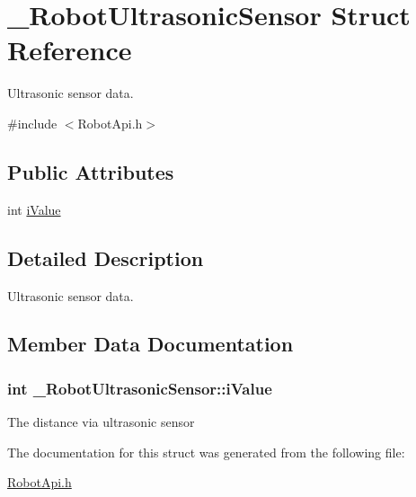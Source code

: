 \hypertarget{struct__RobotUltrasonicSensor}{\section{\-\_\-\-Robot\-Ultrasonic\-Sensor Struct Reference}
\label{struct__RobotUltrasonicSensor}
}


Ultrasonic sensor data.  




{\ttfamily \#include $<$Robot\-Api.\-h$>$}

\subsection*{Public Attributes}
\begin{DoxyCompactItemize}
\item 
int \hyperlink{struct__RobotUltrasonicSensor_a5ca5e4487dcbe1a83820e06ddcd9c047}{i\-Value}
\end{DoxyCompactItemize}


\subsection{Detailed Description}
Ultrasonic sensor data. 

\subsection{Member Data Documentation}
\hypertarget{struct__RobotUltrasonicSensor_a5ca5e4487dcbe1a83820e06ddcd9c047}{
\subsubsection[{i\-Value}]{\setlength{\rightskip}{0pt plus 5cm}int \-\_\-\-Robot\-Ultrasonic\-Sensor\-::i\-Value}}\label{struct__RobotUltrasonicSensor_a5ca5e4487dcbe1a83820e06ddcd9c047}
The distance via ultrasonic sensor 

The documentation for this struct was generated from the following file\-:\begin{DoxyCompactItemize}
\item 
\hyperlink{RobotApi_8h}{Robot\-Api.\-h}\end{DoxyCompactItemize}
